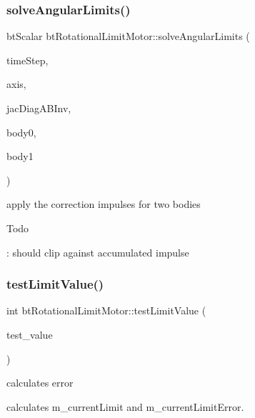 \subsubsection{\texorpdfstring{solve\+Angular\+Limits()}{solveAngularLimits()}}
{\footnotesize\ttfamily bt\+Scalar bt\+Rotational\+Limit\+Motor\+::solve\+Angular\+Limits (\begin{DoxyParamCaption}\item[{bt\+Scalar}]{time\+Step,  }\item[{bt\+Vector3 \&}]{axis,  }\item[{bt\+Scalar}]{jac\+Diag\+A\+B\+Inv,  }\item[{\hyperlink{classbtRigidBody}{bt\+Rigid\+Body} $\ast$}]{body0,  }\item[{\hyperlink{classbtRigidBody}{bt\+Rigid\+Body} $\ast$}]{body1 }\end{DoxyParamCaption})}



apply the correction impulses for two bodies 

\begin{DoxyRefDesc}{Todo}
\item[\hyperlink{todo__todo000028}{Todo}]\+: should clip against accumulated impulse \end{DoxyRefDesc}
\mbox{\label{classbtRotationalLimitMotor_ac0651bd36beda2dbb23c45a90dc1cccd}} 
\subsubsection{\texorpdfstring{test\+Limit\+Value()}{testLimitValue()}\hspace{0.1cm}{\footnotesize\ttfamily [1/2]}}
{\footnotesize\ttfamily int bt\+Rotational\+Limit\+Motor\+::test\+Limit\+Value (\begin{DoxyParamCaption}\item[{bt\+Scalar}]{test\+\_\+value }\end{DoxyParamCaption})}



calculates error 

calculates m\+\_\+current\+Limit and m\+\_\+current\+Limit\+Error. \mbox{\label{classbtRotationalLimitMotor_ac0651bd36beda2dbb23c45a90dc1cccd}} 
